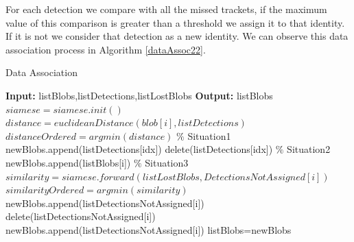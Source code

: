 For each detection we compare with all the missed trackets, if the maximum value of this  comparison is greater than a threshold we assign it to that identity. If it is not we consider that detection as a new identity. We can observe this data association process in Algorithm \ref{dataAssoc22}.



\begin{algorithm}
\caption{Data Association}\label{dataAssoc22}
\begin{algorithmic}[1]
\State \textbf{Input:} listBlobs,listDetections,listLostBlobs 
\State \textbf{Output:} listBlobs
\State $siamese = siamese.init()$
\State $distance = euclideanDistance(blob[i],listDetections)$
\State $distanceOrdered = argmin(distance)$
\State $\%$ Situation1
\State newBlobs.append(listDetections[idx])
\State delete(listDetections[idx])
\State $\%$ Situation2
\Else
\State newBlobs.append(listBlobs[i])
\EndIf
\EndFor
\State $\%$ Situation3
\State $similarity = siamese.forward(listLostBlobs,DetectionsNotAssigned[i])$
\State $similarityOrdered = argmin(similarity)$
\State newBlobs.append(listDetectionsNotAssigned[i])
\State delete(listDetectionsNotAssigned[i])
\Else
\State newBlobs.append(listDetectionsNotAssigned[i])
\EndIf
\EndFor
\EndProcedure
\State listBlobs=newBlobs
\end{algorithmic}
\end{algorithm}


